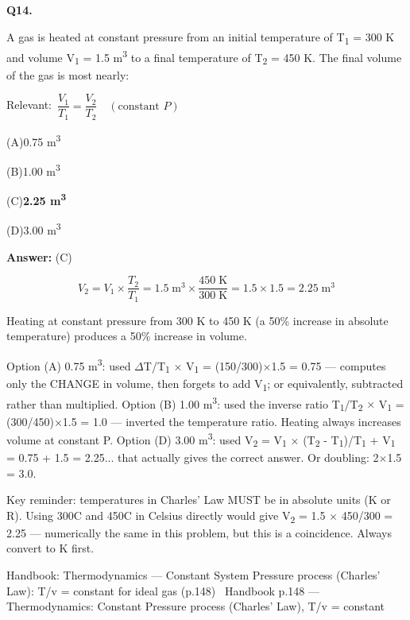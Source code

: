 \documentclass[11pt]{article}
\newcommand{\correct}[1]{\textbf{#1}\;{\color{accent}$\checkmark$}}
\newcommand{\optline}[2]{\par\noindent\hspace{1.2em}(#1)\hspace{0.6em}#2}
\begin{document}
\vspace{9pt}
\filbreak
\textbf{\color{accent}Q14.}\par\vspace{2pt}
A gas is heated at constant pressure from an initial temperature of T\textsubscript{1} = 300 K and volume V\textsubscript{1} = 1.5 m\textsuperscript{3} to a final temperature of T\textsubscript{2} = 450 K. The final volume of the gas is most nearly:\par\vspace{3pt}
{\small\color{soft}Relevant:}\ $\dfrac{V_1}{T_1} = \dfrac{V_2}{T_2} \quad (\text{constant } P)$\par\vspace{3pt}
\optline{A}{0.75 m\textsuperscript{3}}
\optline{B}{1.00 m\textsuperscript{3}}
\optline{C}{\correct{2.25 m\textsuperscript{3}}}
\optline{D}{3.00 m\textsuperscript{3}}
\par\vspace{3pt}
\vspace{2pt}\par\noindent\colorbox{boxbg}{\parbox{\dimexpr\linewidth-2\fboxsep\relax}{%
\vspace{2pt}\textbf{Answer:} (C)\par\vspace{2pt}
{\small \[V_2 = V_1 \times \frac{T_2}{T_1} = 1.5\;\text{m}^3 \times \frac{450\;\text{K}}{300\;\text{K}} = 1.5 \times 1.5 = 2.25\;\text{m}^3\]

Heating at constant pressure from 300 K to 450 K (a 50\% increase in absolute temperature) produces a 50\% increase in volume.

Option (A) 0.75 m\textsuperscript{3}: used $\Delta$T/T\textsubscript{1} $\times$ V\textsubscript{1} = (150/300)$\times$1.5 = 0.75 --- computes only the CHANGE in volume, then forgets to add V\textsubscript{1}; or equivalently, subtracted rather than multiplied. Option (B) 1.00 m\textsuperscript{3}: used the inverse ratio T\textsubscript{1}/T\textsubscript{2} $\times$ V\textsubscript{1} = (300/450)$\times$1.5 = 1.0 --- inverted the temperature ratio. Heating always increases volume at constant P. Option (D) 3.00 m\textsuperscript{3}: used V\textsubscript{2} = V\textsubscript{1} $\times$ (T\textsubscript{2} - T\textsubscript{1})/T\textsubscript{1} + V\textsubscript{1} = 0.75 + 1.5 = 2.25... that actually gives the correct answer. Or doubling: 2$\times$1.5 = 3.0.

Key reminder: temperatures in Charles' Law MUST be in absolute units (K or \textdegree{}R). Using 300\textdegree{}C and 450\textdegree{}C in Celsius directly would give V\textsubscript{2} = 1.5 $\times$ 450/300 = 2.25 --- numerically the same in this problem, but this is a coincidence. Always convert to K first.}\par\vspace{2pt}
{\footnotesize\color{soft}Handbook: Thermodynamics --- Constant System Pressure process (Charles' Law): T/v = constant for ideal gas (p.148) \textbullet\ Handbook p.148 --- Thermodynamics: Constant Pressure process (Charles' Law), T/v = constant}\vspace{2pt}
}}
\end{document}
